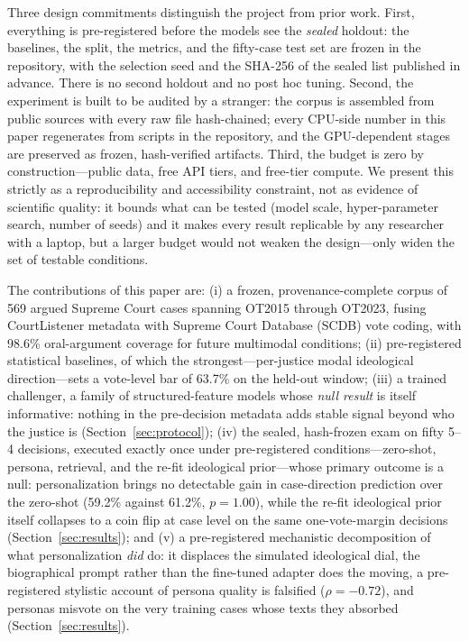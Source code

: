 Three design commitments distinguish the project from prior work.
First, everything is pre-registered before the models see the
\emph{sealed} holdout: the baselines, the split, the metrics, and the
fifty-case test set are frozen in the repository, with the selection
seed and the SHA-256 of the sealed list published in advance. There is
no second holdout and no post hoc tuning. Second, the experiment is
built to be audited by a stranger: the corpus is assembled from public
sources with every raw file hash-chained; every CPU-side number in this
paper regenerates from scripts in the repository, and the GPU-dependent
stages are preserved as frozen, hash-verified artifacts. Third, the budget is
zero by construction---public data, free API tiers, and free-tier
compute. We present this strictly as a reproducibility and
accessibility constraint, not as evidence of scientific quality: it
bounds what can be tested (model scale, hyper-parameter search, number
of seeds) and it makes every result replicable by any researcher with
a laptop, but a larger budget would not weaken the design---only widen
the set of testable conditions.

The contributions of this paper are: (i) a frozen,
provenance-complete corpus of 569 argued Supreme Court cases spanning
OT2015 through OT2023, fusing CourtListener metadata with Supreme Court
Database (SCDB) vote coding, with 98.6\% oral-argument coverage for
future multimodal conditions; (ii) pre-registered statistical
baselines, of which the strongest---per-justice modal ideological
direction---sets a vote-level bar of 63.7\% on the held-out window;
(iii) a trained challenger, a family of structured-feature models whose
\emph{null result} is itself informative: nothing in the
pre-decision metadata adds stable signal beyond who the justice is
(Section~\ref{sec:protocol}); (iv) the sealed, hash-frozen exam on
fifty 5--4 decisions, executed exactly once under pre-registered
conditions---zero-shot, persona, retrieval, and the re-fit ideological
prior---whose primary outcome is a null: personalization brings no
detectable gain in case-direction prediction over the zero-shot (59.2\% against
61.2\%, $p=1.00$), while the re-fit ideological prior itself collapses
to a coin flip at case level on the same one-vote-margin decisions
(Section~\ref{sec:results}); and (v) a pre-registered mechanistic
decomposition of what personalization \emph{did} do: it displaces the
simulated ideological dial, the biographical prompt rather than the
fine-tuned adapter does the moving, a pre-registered stylistic account
of persona quality is falsified ($\rho=-0.72$), and personas misvote
on the very training cases whose texts they absorbed
(Section~\ref{sec:results}).

